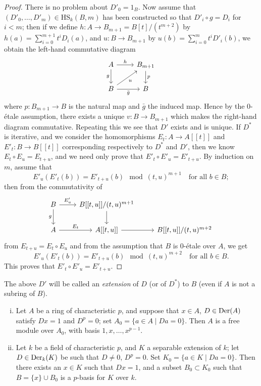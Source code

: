 \begin{proof}
There is no problem about $D'_0 = 1_B$. Now assume that
$(D'_0, \ldots, D'_m) \in \mathrm{HS}_k(B, m)$ has been constructed so that
$D'_i \circ g = D_i$ for $i < m$; then if we define
$h\colon A \to B_{m+1} = B[t]/(t^{m+2})$ by $h(a) = \sum_{i=0}^{m+1} t^iD_i(a)$,
and $u\colon B \to B_{m+1}$ by $u(b) = \sum_{i=0}^{m} t^iD'_i(b)$, we obtain the left-hand
commutative diagram
\[
\begin{tikzcd}
A \arrow[r, "h"] \arrow[d, "g"'] & B_{m+1} \arrow[d, "p"] \\
B \arrow[ru, "u"'] \arrow[r, "\bar{g}"'] & B
\end{tikzcd}
\]
where $p\colon B_{m+1} \to B$ is the natural map and $\bar{g}$ the induced map. Hence by the
0-\'etale assumption, there exists a unique $v\colon B \to B_{m+1}$ which makes the
right-hand diagram commutative. Repeating this we see that $D'$ exists and is
unique. If $D^*$ is iterative, and we consider the homomorphisms
$E_t\colon A \to A[[t]]$ and $E'_t\colon B \to B[[t]]$ corresponding respectively to $D^*$ and
$D'$, then we know $E_t \circ E_u = E_{t+u}$, and we need only prove that
$E'_t \circ E'_u = E'_{t+u}$. By induction on $m$, assume that
\[
  E'_u(E'_t(b)) = E'_{t+u}(b) \mod (t, u)^{m+1} \quad \text{for all } b \in B;
\]
then from the commutativity of
\[
\begin{tikzcd}
B \arrow[r, "E'_u"] \arrow[d, "g"'] & B[[t, u]]/(t, u)^{m+1} \arrow[d] \\
A \arrow[r, "E_t"] & A[[t, u]] \arrow[r] & B[[t, u]]/(t, u)^{m+2}
\end{tikzcd}
\]
from $E_{t+u} = E_t \circ E_u$ and from the assumption that $B$ is 0-\'etale over $A$, we get
\[
  E'_u(E'_t(b)) = E'_{t+u}(b) \mod (t, u)^{m+2} \quad \text{for all } b \in B.
\]
This proves that $E'_t \circ E'_u = E'_{t+u}$.
\end{proof}

\begin{remark}
The above $D'$ will be called an \emph{extension} of $D$ (or of $D^*$) to $B$ (even if $A$ is
not a subring of $B$).
\end{remark}

\begin{theorem}\label{thm:27.3}
\begin{enumerate}[(i)]
  \item Let $A$ be a ring of characteristic $p$, and suppose that $x \in A$,
        $D \in \operatorname{Der}(A)$ satisfy $Dx = 1$ and $D^p = 0$; set $A_0 = \{a \in A \mid Da = 0\}$.
        Then $A$ is a free module over $A_0$, with basis $1, x, \ldots, x^{p-1}$.
  \item Let $k$ be a field of characteristic $p$, and $K$ a separable extension of $k$;
        let $D \in \operatorname{Der}_k(K)$ be such that $D \ne 0$, $D^p = 0$. Set
        $K_0 = \{a \in K \mid Da = 0\}$. Then there exists an $x \in K$ such that $Dx = 1$,
        and a subset $B_0 \subset K_0$ such that $B = \{x\} \cup B_0$ is a $p$-basis for $K$ over
        $k$.
\end{enumerate}
\end{theorem}

